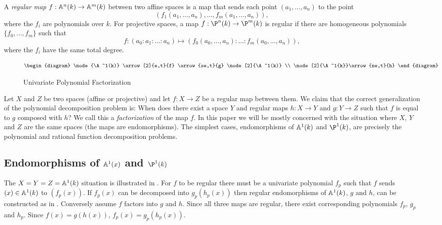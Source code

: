 A {\em regular map} $f: \mathbb{A}^n(k) \rightarrow \mathbb{A}^m(k)$ between two
affine spaces is a map that sends each point $(a_1, \ldots, a_n)$
to the point
\[
(f_1(a_1, \ldots, a_n), \ldots, f_m(a_1, \ldots, a_n)),
\]
where the $f_i$ are polynomials over $k$.  For projective spaces, a
map $f: \P^n(k) \rightarrow \P^m(k)$ is regular if
there are homogeneous polynomials $\{f_0, \ldots, f_m\}$ such that
\[
f : (a_0: a_1: \ldots: a_n) \mapsto 
   (f_0(a_0, \ldots, a_n): \ldots: f_m(a_0, \ldots, a_n)), 
\]
where the $f_i$ have the same total degree.

\begin{figure}
\[
\begin{diagram}
\node{\A^1(k)} \arrow[2]{e,t}{f} \arrow{se,t}{g} \node[2]{\A^1(k)} \\
\node[2]{\A^1{k}}\arrow{ne,t}{h} 
\end{diagram}
\]
\caption{Univariate Polynomial Factorization \label{Polynomial:Factor:Fig}}
\end{figure}

Let $X$ and $Z$ be two spaces (affine or projective) and let
$f:X\rightarrow Z$ be a regular map between them.  We claim that
the correct generalization of the polynomial decomposition problem is:
When does there exist a space $Y$ and regular maps $h:X\rightarrow
Y$ and $g:Y\rightarrow Z$ such that $f$ is equal to $g$ composed
with $h$?  We call this a {\em factorization} of the map $f$.  In this
paper we will be mostly concerned with the situation where $X$, $Y$
and $Z$ are the same spaces (the maps are endomorphisms).  The
simplest cases, endomorphisms of $\mathbb{A}^1(k)$ and $\P^1(k)$, are
precisely the polynomial and rational function decomposition problems.

\subsection{Endomorphisms of \texorpdfstring{$\mathbb{A}^1(x)$}{A1(x)} and 
\texorpdfstring{$\P^1(k)$}{P1(k)}}
\label{Endo:A1:Sec}

The $X=Y=Z=\mathbb{A}^1(k)$ situation is illustrated in
.  For
$f$ to be regular there must be a univariate polynomial $f_p$ such
that $f$ sends $(x) \in \mathbb{A}^1(k)$ to $(f_p(x))$.  If $f_p(x)$ can be
decomposed into $g_p(h_p(x))$ then regular endomorphisms of $\mathbb{A}^1(k)$,
$g$ and $h$, can be constructed as in .
Conversely assume $f$ factors into $g$ and $h$.  Since all three maps
are regular, there exist corresponding polynomials $f_p$, $g_p$ and
$h_p$.  Since $f(x) = g(h(x))$, $f_p(x) = g_p(h_p(x))$.  

